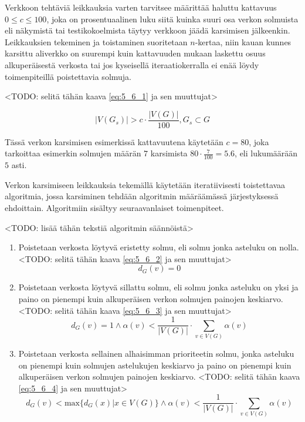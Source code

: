   Verkkoon tehtäviä leikkauksia varten tarvitsee määrittää haluttu kattavuus \(0 \leq c \leq 100\), joka on prosentuaalinen luku siitä kuinka suuri osa verkon solmuista eli näkymistä tai testikokoelmista täytyy verkkoon jäädä karsimisen jälkeenkin.
  Leikkauksien tekeminen ja toistaminen suoritetaan \(n\)-kertaa, niin kauan kunnes karsittu aliverkko on suurempi kuin kattavuuden mukaan laskettu osuus alkuperäisestä verkosta tai jos kyseisellä iteraatiokerralla ei enää löydy toimenpiteillä poistettavia solmuja.

  <TODO: selitä tähän kaava \ref{eq:5_6_1} ja sen muuttujat>

  \begin{equation} \label{eq:5_6_1}
    |V(G_s)| > c \cdot \frac{|V(G)|}{100}, G_s \subset G
  \end{equation}

  Tässä verkon karsimisen esimerkissä kattavuutena käytetään \(c = 80\), joka tarkoittaa esimerkin solmujen määrän \(7\) karsimista \(80 \cdot \frac{7}{100} = 5.6\), eli lukumäärään \(5\) asti.

  Verkon karsimiseen leikkauksia tekemällä käytetään iteratiivisesti toistettavaa algoritmia, jossa karsiminen tehdään algoritmin määräämässä järjestyksessä ehdoittain.
  Algoritmiin sisältyy seuraavanlaiset toimenpiteet.

  <TODO: lisää tähän tekstiä algoritmin säännöistä>

  \begin{enumerate}
    \item Poistetaan verkosta löytyvä eristetty solmu, eli solmu jonka asteluku on nolla.
    <TODO: selitä tähän kaava \ref{eq:5_6_2} ja sen muuttujat>
      \begin{equation} \label{eq:5_6_2}
        d_G(v) = 0
      \end{equation}
    \item Poistetaan verkosta löytyvä sillattu solmu, eli solmu jonka asteluku on yksi ja paino on pienempi kuin alkuperäisen verkon solmujen painojen keskiarvo.
    <TODO: selitä tähän kaava \ref{eq:5_6_3} ja sen muuttujat>
      \begin{equation} \label{eq:5_6_3}
        d_G(v) = 1  \land \alpha(v) < \frac{1}{|V(G)|} \cdot \sum\limits_{v \in V(G)} \alpha(v)
      \end{equation}
    \item Poistetaan verkosta sellainen alhaisimman prioriteetin solmu, jonka asteluku on pienempi kuin solmujen astelukujen keskiarvo ja paino on pienempi kuin alkuperäisen verkon solmujen painojen keskiarvo.
    <TODO: selitä tähän kaava \ref{eq:5_6_4} ja sen muuttujat>
      \begin{equation} \label{eq:5_6_4}
        d_G(v) < \text{max}\{d_G(x) | x \in V(G)\} \land \alpha(v) < \frac{1}{|V(G)|} \cdot \sum\limits_{v \in V(G)} \alpha(v)
      \end{equation}
  \end{enumerate}


